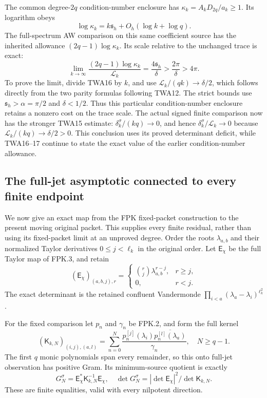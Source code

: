 The common degree-$2q$ condition-number enclosure has
$\kappa_k=A_kD_{2q}/a_k\ge1$. Its logarithm obeys
\[
\log\kappa_k=k\mathfrak s_h+O_h(\log k+\log q).
\tag{TWA16}
\]
The full-spectrum AW comparison on this same coefficient source
has the inherited allowance $(2q-1)\log\kappa_k$. Its scale
relative to the unchanged trace is exact:
\[
\lim_{k\to\infty}\frac{(2q-1)\log\kappa_k}{\mathcal L_k}
=\frac{4\mathfrak s_h}{\delta}
>\frac{2\pi}{\delta}>4\pi.
\tag{TWA17}
\]
To prove the limit, divide TWA16 by $k$, and use
$\mathcal L_k/(qk)\to\delta/2$, which follows directly from
the two parity formulas following TWA12. The strict bounds use
$\mathfrak s_h>\alpha=\pi/2$ and $\delta<1/2$.
Thus this particular condition-number enclosure retains a
nonzero cost on the trace scale. The actual signed finite
comparison now has the stronger TWA15 estimate:
$\delta_k^\sigma/(kq)\to0$, and hence
$\delta_k^\sigma/\mathcal L_k\to0$ because
$\mathcal L_k/(kq)\to\delta/2>0$.
This conclusion uses its proved determinant deficit,
while TWA16--17 continue to state the exact value of the
earlier condition-number allowance.

\subsection{The full-jet asymptotic connected to every finite endpoint}

We now give an exact map from the FPK fixed-packet construction to
the present moving original packet. This supplies every finite
residual, rather than using its fixed-packet limit at an unproved
degree. Order the roots $\lambda_{a,b}$ and their normalized
Taylor derivatives $0\le j<\ell_k$ in the original order. Let
$\mathsf E_\chi$ be the full Taylor map of FPK.3, and retain
\[
(\mathsf E_\chi)_{(a,b,j),r}
=\begin{cases}\binom rj\lambda_{a,b}^{r-j},&r\ge j,\\0,&r<j.
\end{cases}
\]
The exact determinant is the retained confluent Vandermonde
$\prod_{i<a}(\lambda_a-\lambda_i)^{\ell_k^2}$.

For the fixed comparison let $p_n$ and $\gamma_n$ be FPK.2, and
form the full kernel
\[
(\mathsf K_{k,N})_{(i,j),(a,l)}
=\sum_{n=0}^N\frac{p_n^{[j]}(\lambda_i)
                         \overline{p_n^{[l]}(\lambda_a)}}{\gamma_n},
\quad N\ge q-1.
\tag{TWA18}
\]
The first $q$ monic polynomials span every remainder, so this
onto full-jet observation has positive Gram. Its minimum-source
quotient is exactly
\[
G_N^\sigma=\mathsf E_\chi^*\mathsf K_{k,N}^{-1}\mathsf E_\chi,
\quad
\det G_N^\sigma=|\det\mathsf E_\chi|^2/\det\mathsf K_{k,N}.
\tag{TWA19}
\]
These are finite equalities, valid with every nilpotent direction.

